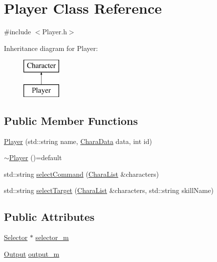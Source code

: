 \hypertarget{class_player}{}\section{Player Class Reference}
\label{class_player}


{\ttfamily \#include $<$Player.\+h$>$}

Inheritance diagram for Player\+:\begin{figure}[H]
\begin{center}
\leavevmode
\includegraphics[height=2.000000cm]{class_player}
\end{center}
\end{figure}
\subsection*{Public Member Functions}
\begin{DoxyCompactItemize}
\item 
\hyperlink{class_player_ac67c2c665f202dd5a8d69eb4b7c39901}{Player} (std\+::string name, \hyperlink{struct_chara_data}{Chara\+Data} data, int id)
\item 
\hyperlink{class_player_a40d3c47b65e9652c363a8fde41f7bbf5}{$\sim$\+Player} ()=default
\item 
std\+::string \hyperlink{class_player_a2dbcfb38080a64dab3f9b721486ab38d}{select\+Command} (\hyperlink{_character_8h_ac22f543a628d2695d0297c399b0272d8}{Chara\+List} \&characters)
\item 
std\+::string \hyperlink{class_player_a38ca95dfba650f93b6dba8a531991f45}{select\+Target} (\hyperlink{_character_8h_ac22f543a628d2695d0297c399b0272d8}{Chara\+List} \&characters, std\+::string skill\+Name)
\end{DoxyCompactItemize}
\subsection*{Public Attributes}
\begin{DoxyCompactItemize}
\item 
\hyperlink{class_selector}{Selector} $\ast$ \hyperlink{class_player_af0f19350382df49aed3f1cb83d46c89b}{selector\+\_\+m}
\item 
\hyperlink{class_output}{Output} \hyperlink{class_player_ad35830aa20e37f039bdcd6f381d54967}{output\+\_\+m}
\end{DoxyCompactItemize}

